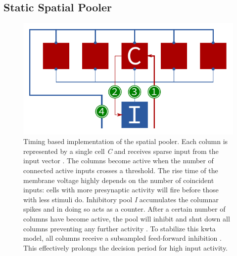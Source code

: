 %
%

\subsection{Static Spatial Pooler}

\begin{figure}
	\begin{center}
		\includegraphics{../circuitry/spatial_pooler.pdf}
	\end{center}
	\caption{Timing based implementation of the spatial pooler. Each column is represented by a single cell \emph{C} and receives sparse input from the input vector \protect{}. The columns become active when the number of connected active inputs crosses a threshold. The rise time of the membrane voltage highly depends on the number of coincident inputs: cells with more presynaptic activity will fire before those with less stimuli do. Inhibitory pool \emph{I} accumulates the columnar spikes \protect{} and in doing so acts as a counter. After a certain number of columns have become active, the pool will inhibit and shut down all columns preventing any further activity \protect{}. To stabilize this \gls{kwta} model, all columns receive a subsampled feed-forward inhibition \protect{}. This effectively prolongs the decision period for high input activity.}
	\label{fig:spatial_pooler}
\end{figure}

